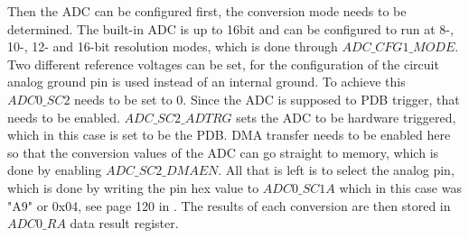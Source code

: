 Then the ADC can be configured first, the conversion mode needs to be determined.
The built-in ADC is up to 16bit and can be configured to run at 8-, 10-, 12- and 16-bit resolution modes, which is done through $ADC\_CFG1\_MODE$.
Two different reference voltages can be set, for the configuration of the circuit analog ground pin is used instead of an internal ground.
To achieve this $ADC0\_SC2$ needs to be set to 0.
Since the ADC is supposed to PDB trigger, that needs to be enabled.
$ADC\_SC2\_ADTRG$ sets the ADC to be hardware triggered, which in this case is set to be the PDB.
DMA transfer needs to be enabled here so that the conversion values of the ADC can go straight to memory, which is done by enabling  $ADC\_SC2\_DMAEN$.
All that is left is to select the analog pin, which is done by writing the pin hex value to $ADC0\_SC1A$ which in this case was "A9" or 0x04, see page 120 in \cite{freescale_semiconductor_kinetis_2021}.
The results of each conversion are then stored in $ADC0\_RA$ data result register.

